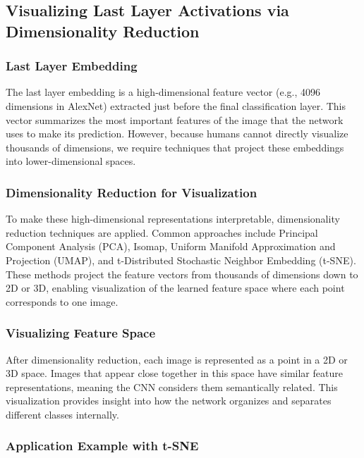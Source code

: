 \documentclass{article}
\begin{document}
\subsection{Visualizing Last Layer Activations via Dimensionality Reduction}

\subsubsection{Last Layer Embedding}

The last layer embedding is a high-dimensional feature vector (e.g., 4096 dimensions in AlexNet) extracted just before the final classification layer. This vector summarizes the most important features of the image that the network uses to make its prediction. However, because humans cannot directly visualize thousands of dimensions, we require techniques that project these embeddings into lower-dimensional spaces.

\subsubsection{Dimensionality Reduction for Visualization}

To make these high-dimensional representations interpretable, dimensionality reduction techniques are applied. Common approaches include Principal Component Analysis (PCA), Isomap, Uniform Manifold Approximation and Projection (UMAP), and t-Distributed Stochastic Neighbor Embedding (t-SNE). These methods project the feature vectors from thousands of dimensions down to 2D or 3D, enabling visualization of the learned feature space where each point corresponds to one image.

\subsubsection{Visualizing Feature Space}

After dimensionality reduction, each image is represented as a point in a 2D or 3D space. Images that appear close together in this space have similar feature representations, meaning the CNN considers them semantically related. This visualization provides insight into how the network organizes and separates different classes internally.

\subsubsection{Application Example with t-SNE}
\end{document}
